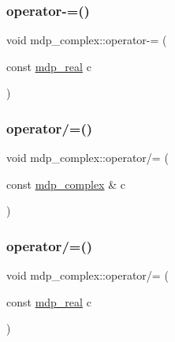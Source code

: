 \mbox{\label{classmdp__complex_a5388821dab285a814eef49281c3a69e4}} 
\subsubsection{\texorpdfstring{operator-\/=()}{operator-=()}\hspace{0.1cm}{\footnotesize\ttfamily [2/2]}}
{\footnotesize\ttfamily void mdp\+\_\+complex\+::operator-\/= (\begin{DoxyParamCaption}\item[{const \hyperlink{mdp__global__vars_8h_a69d96b74c791e0bbdb888b3913a69450}{mdp\+\_\+real}}]{c }\end{DoxyParamCaption})\hspace{0.3cm}{\ttfamily [inline]}}

\mbox{\label{classmdp__complex_a0dc8af0f39405418b2dacde050e10e5f}} 
\subsubsection{\texorpdfstring{operator/=()}{operator/=()}\hspace{0.1cm}{\footnotesize\ttfamily [1/2]}}
{\footnotesize\ttfamily void mdp\+\_\+complex\+::operator/= (\begin{DoxyParamCaption}\item[{const \hyperlink{classmdp__complex}{mdp\+\_\+complex} \&}]{c }\end{DoxyParamCaption})\hspace{0.3cm}{\ttfamily [inline]}}

\mbox{\label{classmdp__complex_aa040dd29ac7484eb770f940a4761c435}} 
\subsubsection{\texorpdfstring{operator/=()}{operator/=()}\hspace{0.1cm}{\footnotesize\ttfamily [2/2]}}
{\footnotesize\ttfamily void mdp\+\_\+complex\+::operator/= (\begin{DoxyParamCaption}\item[{const \hyperlink{mdp__global__vars_8h_a69d96b74c791e0bbdb888b3913a69450}{mdp\+\_\+real}}]{c }\end{DoxyParamCaption})\hspace{0.3cm}{\ttfamily [inline]}}

